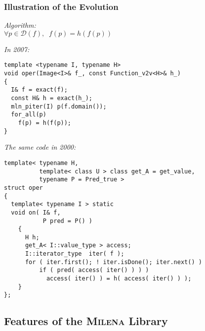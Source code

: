 \documentclass{beamer}
\newcommand{\mln}{\textsc{Milena}\xspace}
\begin{document}
\begin{frame}[fragile]
  \frametitle{Illustration of the Evolution}


\begin{minipage}{0.5\linewidth}
{\it Algorithm:}\\
\smallskip
{\tiny
$\forall p \in \mathcal{D}(f), \;\; f(p) = \mathit{h}(f(p))$
}

\bigskip\medskip

{\it In 2007:}
\smallskip
\begin{lstlisting}[basicstyle={\tiny\sffamily}]
template <typename I, typename H>
void oper(Image<I>& f_, const Function_v2v<H>& h_)
{
  I& f = exact(f);
  const H& h = exact(h_);
  mln_piter(I) p(f.domain());
  for_all(p)
    f(p) = h(f(p));
}

\end{lstlisting}

\end{minipage}
  \hspace*{2mm}
\begin{minipage}{.45\linewidth}

{\it The same code in 2000:}
\smallskip
\begin{lstlisting}[basicstyle={\tiny\sffamily}]
template< typename H,
          template< class U > class get_A = get_value,
          typename P = Pred_true >
struct oper
{
  template< typename I > static
  void on( I& f,
           P pred = P() )
    {
      H h;
      get_A< I::value_type > access;
      I::iterator_type  iter( f );
      for ( iter.first(); ! iter.isDone(); iter.next() )
          if ( pred( access( iter() ) ) )
            access( iter() ) = h( access( iter() ) );
    }
};
\end{lstlisting}
  
\end{minipage}

\end{frame}



\subsection{Features of the \mln Library}
\end{document}
